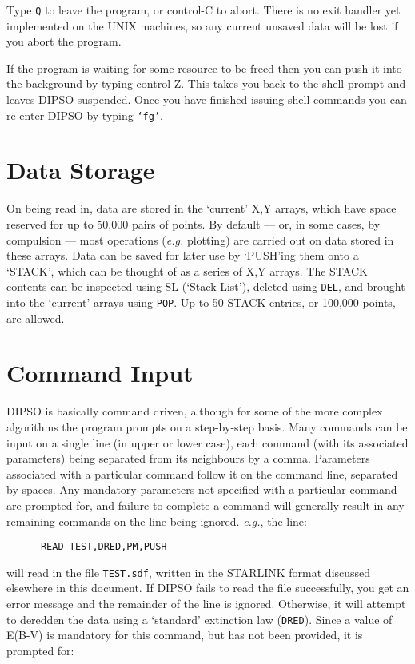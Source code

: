 Type {\tt Q} to leave the program, or control-C to abort. There is no
exit handler yet implemented on the UNIX machines, so any current
unsaved data will be lost if you abort the program.

If the program is waiting for some resource to be freed then you can 
push it into the background by typing control-Z. This takes you back
to the shell prompt and leaves DIPSO suspended. Once you have finished
issuing shell commands you can re-enter DIPSO by typing {\tt `fg'}.


\section {Data Storage}

On being read in, data are stored in the `current' X,Y arrays, which
have space reserved for up to 50,000 pairs of points. By default ---
or, in some cases, by compulsion --- most operations ({\em e.g.}
plotting) are carried out on data stored in these arrays. Data can be
saved for later use by `PUSH'ing them onto a `STACK', which can be
thought of as a series of X,Y arrays. The STACK contents can be
inspected using SL (`Stack List'), deleted using {\tt DEL}, and
brought into the `current' arrays using {\tt POP}. Up to 50 STACK
entries, or 100,000 points, are allowed.

\section {Command Input}

DIPSO is basically command driven, although for some of the more
complex algorithms the program prompts on a step-by-step basis. Many
commands can be input on a single line (in upper or lower case), each
command (with its associated parameters) being separated from its
neighbours by a comma. Parameters associated with a particular command
follow it on the command line, separated by spaces. Any mandatory
parameters not specified with a particular command are prompted for,
and failure to complete a command will generally result in any
remaining commands on the line being ignored. {\em e.g.}, the line:

\begin{verbatim}
      READ TEST,DRED,PM,PUSH
\end{verbatim}

will read in the file {\tt TEST.sdf}, written in the STARLINK format
discussed elsewhere in this document. If DIPSO fails to read the file
successfully, you get an error message and the remainder of the line
is ignored. Otherwise, it will attempt to deredden the data using a
`standard' extinction law ({\tt DRED}). Since a value of E(B-V) is
mandatory for this command, but has not been provided, it is prompted
for:

